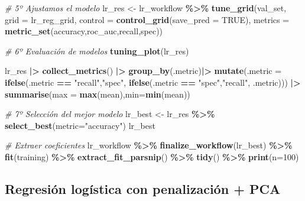 \documentclass[12pt,a4paper,]{book}
\newenvironment{Shaded}{\begin{snugshade}}{\end{snugshade}}
\newcommand{\AttributeTok}[1]{\textcolor[rgb]{0.13,0.29,0.53}{#1}}
\newcommand{\CommentTok}[1]{\textcolor[rgb]{0.56,0.35,0.01}{\textit{#1}}}
\newcommand{\ConstantTok}[1]{\textcolor[rgb]{0.56,0.35,0.01}{#1}}
\newcommand{\DecValTok}[1]{\textcolor[rgb]{0.00,0.00,0.81}{#1}}
\newcommand{\FunctionTok}[1]{\textcolor[rgb]{0.13,0.29,0.53}{\textbf{#1}}}
\newcommand{\NormalTok}[1]{#1}
\newcommand{\OtherTok}[1]{\textcolor[rgb]{0.56,0.35,0.01}{#1}}
\newcommand{\SpecialCharTok}[1]{\textcolor[rgb]{0.81,0.36,0.00}{\textbf{#1}}}
\newcommand{\StringTok}[1]{\textcolor[rgb]{0.31,0.60,0.02}{#1}}
\numberwithin{dummy}{section}
\theoremstyle{ocrenumbox}
\theoremstyle{blacknumex}
\theoremstyle{blacknumbox}
\theoremstyle{ocrenum}
\theoremstyle{ocrenum}
\begin{document}
\begin{Shaded}
\begin{Highlighting}[]
\CommentTok{\# 5º Ajustamos el modelo}
\NormalTok{lr\_res }\OtherTok{\textless{}{-}} 
\NormalTok{  lr\_workflow }\SpecialCharTok{\%\textgreater{}\%} 
  \FunctionTok{tune\_grid}\NormalTok{(val\_set,}
            \AttributeTok{grid =}\NormalTok{ lr\_reg\_grid,}
            \AttributeTok{control =} \FunctionTok{control\_grid}\NormalTok{(}\AttributeTok{save\_pred =} \ConstantTok{TRUE}\NormalTok{),}
            \AttributeTok{metrics =} \FunctionTok{metric\_set}\NormalTok{(accuracy,roc\_auc,recall,spec))}

\CommentTok{\# 6º Evaluación de modelos}
\FunctionTok{tuning\_plot}\NormalTok{(lr\_res)}

\NormalTok{lr\_res }\SpecialCharTok{|\textgreater{}} 
  \FunctionTok{collect\_metrics}\NormalTok{() }\SpecialCharTok{|\textgreater{}} 
  \FunctionTok{group\_by}\NormalTok{(.metric)}\SpecialCharTok{|\textgreater{}} 
  \FunctionTok{mutate}\NormalTok{(}\AttributeTok{.metric =} \FunctionTok{ifelse}\NormalTok{(.metric }\SpecialCharTok{==} \StringTok{"recall"}\NormalTok{,}\StringTok{"spec"}\NormalTok{,}
                          \FunctionTok{ifelse}\NormalTok{(.metric }\SpecialCharTok{==} \StringTok{"spec"}\NormalTok{,}\StringTok{"recall"}\NormalTok{,}
\NormalTok{                                 .metric))) }\SpecialCharTok{|\textgreater{}} 
  \FunctionTok{summarise}\NormalTok{(}\AttributeTok{max =} \FunctionTok{max}\NormalTok{(mean),}\AttributeTok{min=}\FunctionTok{min}\NormalTok{(mean))   }


\CommentTok{\# 7º Selección del mejor modelo}
\NormalTok{lr\_best }\OtherTok{\textless{}{-}} 
\NormalTok{  lr\_res }\SpecialCharTok{\%\textgreater{}\%} 
  \FunctionTok{select\_best}\NormalTok{(}\AttributeTok{metric=}\StringTok{"accuracy"}\NormalTok{)}
\NormalTok{lr\_best}

\CommentTok{\# Extraer coeficientes}
\NormalTok{lr\_workflow }\SpecialCharTok{\%\textgreater{}\%} 
  \FunctionTok{finalize\_workflow}\NormalTok{(lr\_best) }\SpecialCharTok{\%\textgreater{}\%}
  \FunctionTok{fit}\NormalTok{(training) }\SpecialCharTok{\%\textgreater{}\%} 
  \FunctionTok{extract\_fit\_parsnip}\NormalTok{() }\SpecialCharTok{\%\textgreater{}\%} 
  \FunctionTok{tidy}\NormalTok{() }\SpecialCharTok{\%\textgreater{}\%} 
  \FunctionTok{print}\NormalTok{(}\AttributeTok{n=}\DecValTok{100}\NormalTok{)}
\end{Highlighting}
\end{Shaded}

\hypertarget{regresiuxf3n-loguxedstica-con-penalizaciuxf3n-pca}{%
\subsection{Regresión logística con penalización +
PCA}\label{regresiuxf3n-loguxedstica-con-penalizaciuxf3n-pca}}
\end{document}
